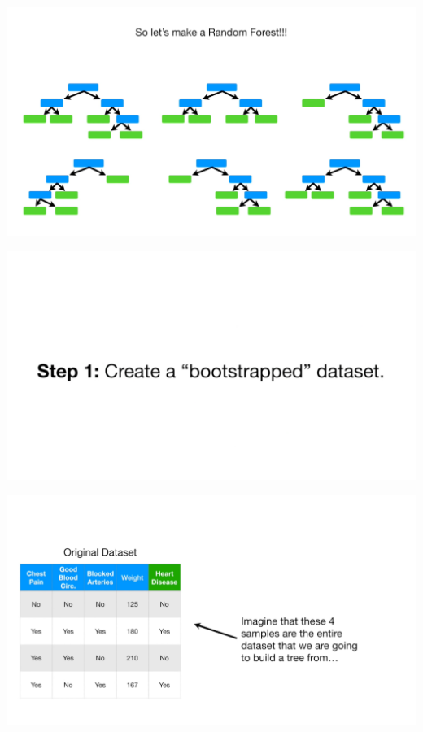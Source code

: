 \documentclass[
  ignorenonframetext,
]{beamer}
\begin{document}
\begin{frame}{}
\protect\hypertarget{section-8}{}
\includegraphics{images/r9.png}
\end{frame}

\begin{frame}{}
\protect\hypertarget{section-9}{}
\includegraphics{images/r10.png}
\end{frame}

\begin{frame}{}
\protect\hypertarget{section-10}{}
\includegraphics{images/r11.png}
\end{frame}
\end{document}
